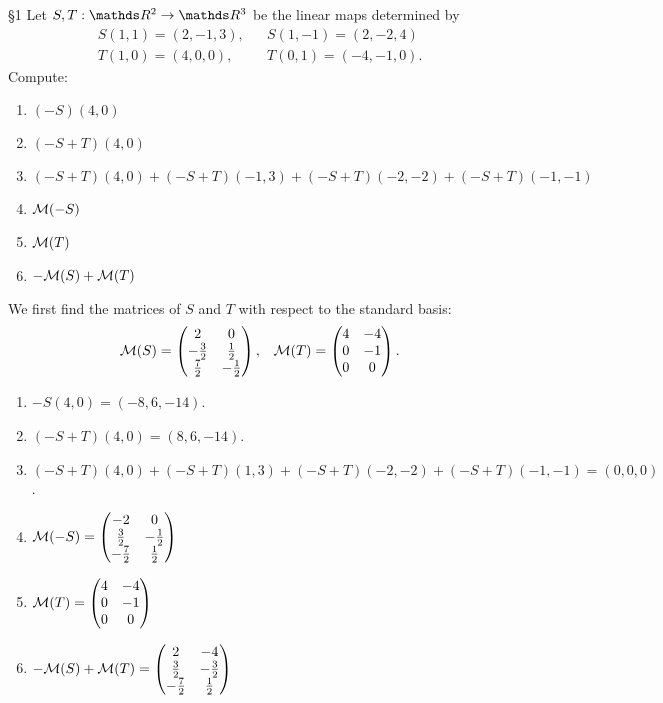 \documentclass{review-sheet}
\begin{document}
\begin{problem}{\S 1}
  Let $S,T:\R^2\to \R^3$ be the linear maps determined by
  \begin{align*}
    S(1,1)=(2,-1,3), && S(1,-1) = (2,-2,4)\\
    T(1,0)=(4,0,0), && T(0,1) = (-4,-1,0)
  .\end{align*}
  Compute:
  \begin{enumerate}[label=(\alph*)]
    \item $(-S)(4,0)$
    \item  $(-S+T)(4,0)$
    \item  $(-S+T)(4,0)+(-S+T)(-1,3)+(-S+T)(-2,-2)+(-S+T)(-1,-1)$ 
    \item $ \mathcal{M}(-S)$
    \item $\mathcal{M}(T)$
    \item $-\mathcal{M}(S)+\mathcal{M}(T)$
  \end{enumerate}
\end{problem}

\begin{solution}
  We first find the matrices of $S$ and $T$ with respect to the standard basis:
  \begin{align*}
    \mathcal{M}(S)=\begin{pmatrix} 2&0\\-\frac{3}{2}&\frac{1}{2}\\\frac{7}{2}&-\frac{1}{2}
      \end{pmatrix},&& \mathcal{M}(T)=\begin{pmatrix} 4&-4\\0&-1\\0&0 \end{pmatrix} 
  .\end{align*}

  \begin{enumerate}[label=(\alph*)]
    \item $-S(4,0)=(-8,6,-14)$.
    \item  $(-S+T)(4,0)=(8,6,-14)$.
    \item  $(-S+T)(4,0)+(-S+T)(1,3)+(-S+T)(-2,-2)+(-S+T)(-1,-1)=(0,0,0)$.
    \item $\mathcal{M}(-S)=\begin{pmatrix} -2&0\\\frac{3}{2}&-\frac{1}{2}\\-\frac{7}{2}&\frac{1}{2} \end{pmatrix} $ 
    \item $\mathcal{M}(T)=\begin{pmatrix} 4&-4\\0&-1\\0&0 \end{pmatrix}$
    \item $-\mathcal{M}(S)+\mathcal{M}(T)=\begin{pmatrix}
      2&-4\\\frac{3}{2}&-\frac{3}{2}\\-\frac{7}{2}&\frac{1}{2} \end{pmatrix} $
  \end{enumerate}
\end{solution}
\end{document}
